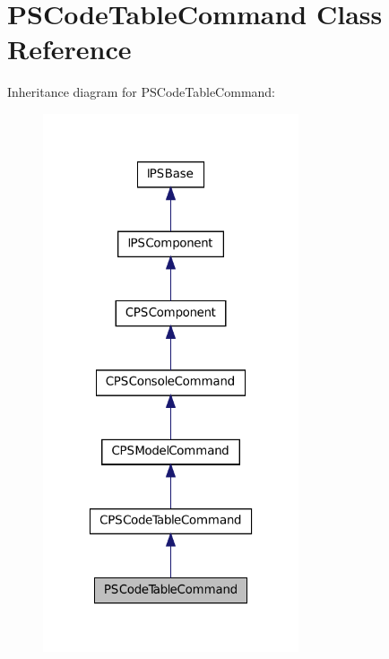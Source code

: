\hypertarget{classPSCodeTableCommand}{
\section{PSCodeTableCommand Class Reference}
\label{classPSCodeTableCommand}
}


Inheritance diagram for PSCodeTableCommand:\nopagebreak
\begin{figure}[H]
\begin{center}
\leavevmode
\includegraphics[width=214pt]{classPSCodeTableCommand__inherit__graph}
\end{center}
\end{figure}


